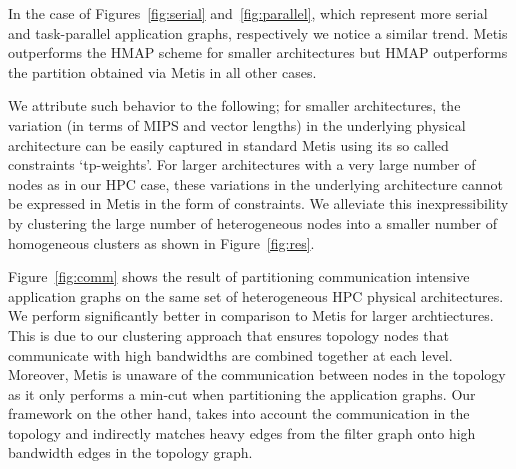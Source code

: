 In the case of Figures~\ref{fig:serial} and~\ref{fig:parallel}, which
represent more serial and task-parallel application graphs, respectively
we notice a similar trend. Metis outperforms the HMAP scheme for smaller
architectures but HMAP outperforms the partition obtained via Metis in
all other cases.


We attribute such behavior to the following; for smaller architectures,
the variation (in terms of MIPS and vector lengths) in the underlying
physical architecture can be easily captured in standard Metis using its
so called constraints `tp-weights'. For larger architectures with a very
large number of nodes as in our HPC case, these variations in the
underlying architecture cannot be expressed in Metis in the form of
constraints. We alleviate this inexpressibility by clustering the large
number of heterogeneous nodes into a smaller number of homogeneous
clusters as shown in Figure~\ref{fig:res}.


Figure~\ref{fig:comm} shows the result of partitioning communication
intensive application graphs on the same set of heterogeneous HPC
physical architectures. We perform significantly better in comparison to
Metis for larger archtiectures. This is due to our clustering approach
that ensures topology nodes that communicate with high bandwidths are
combined together at each level. Moreover, Metis is unaware of the
communication between nodes in the topology as it only performs a
min-cut when partitioning the application graphs. Our framework on the
other hand, takes into account the communication in the topology and
indirectly matches heavy edges from the filter graph onto high bandwidth
edges in the topology graph.

